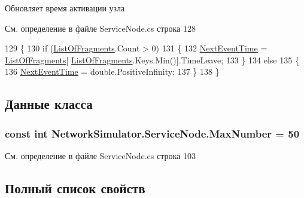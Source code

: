 Обновляет время активации узла 



См. определение в файле Service\+Node.\+cs строка 128


\begin{DoxyCode}
129         \{
130             \textcolor{keywordflow}{if} (\hyperlink{class_network_simulator_1_1_service_node_aec726744aa9a2c5a657424ecc9666f27}{ListOfFragments}.Count > 0)
131             \{
132                 \hyperlink{class_network_simulator_1_1_node_ab3ae85d27d7e9056751bd826f1a3432b}{NextEventTime} = \hyperlink{class_network_simulator_1_1_service_node_aec726744aa9a2c5a657424ecc9666f27}{ListOfFragments}[
      \hyperlink{class_network_simulator_1_1_service_node_aec726744aa9a2c5a657424ecc9666f27}{ListOfFragments}.Keys.Min()].TimeLeave;
133             \}
134             \textcolor{keywordflow}{else}
135             \{
136                 \hyperlink{class_network_simulator_1_1_node_ab3ae85d27d7e9056751bd826f1a3432b}{NextEventTime} = \textcolor{keywordtype}{double}.PositiveInfinity;
137             \}
138         \}
\end{DoxyCode}


\subsection{Данные класса}
\subsubsection[{\texorpdfstring{Max\+Number}{MaxNumber}}]{\setlength{\rightskip}{0pt plus 5cm}const int Network\+Simulator.\+Service\+Node.\+Max\+Number = 50\hspace{0.3cm}{\ttfamily [private]}}\hypertarget{class_network_simulator_1_1_service_node_af7fdaf157c712f254b81ecc23ca8d843}{}\label{class_network_simulator_1_1_service_node_af7fdaf157c712f254b81ecc23ca8d843}


См. определение в файле Service\+Node.\+cs строка 103



\subsection{Полный список свойств}
